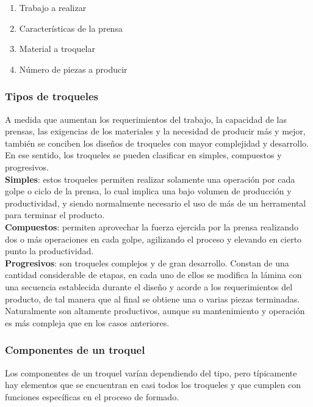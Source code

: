 \begin{enumerate}
\item Trabajo a realizar 
\item Características de la prensa
\item Material a troquelar
\item Número de piezas a producir
\end{enumerate}

\subsubsection{Tipos de troqueles}

A medida que aumentan los requerimientos del trabajo, la capacidad de las prensas, las exigencias 
de los materiales y la necesidad de producir más y mejor, también se conciben los diseños de 
troqueles con mayor complejidad y desarrollo. En ese sentido, los troqueles se pueden clasificar 
en simples, compuestos y progresivos.\\

\textbf{Simples}: estos troqueles permiten realizar solamente una operación por cada golpe o 
ciclo de la prensa, lo cual implica una bajo volumen de producción y productividad, y 
siendo normalmente necesario el uso de más de un herramental para terminar el producto.\\

\textbf{Compuestos}: permiten aprovechar la fuerza ejercida por la prensa realizando dos 
o más operaciones en cada golpe, agilizando el proceso y elevando en cierto punto 
la productividad.\\

\textbf{Progresivos}: son troqueles complejos y de gran desarrollo. Constan de una 
cantidad considerable de etapas, en cada uno de ellos se modifica la lámina con una secuencia 
establecida durante el diseño y acorde a los requerimientos del producto, de tal manera 
que al final se obtiene una o varias piezas terminadas. Naturalmente son altamente productivos, 
aunque su mantenimiento y operación es más compleja que en los casos anteriores.

\subsubsection{Componentes de un troquel}

Los componentes de un troquel varían dependiendo del tipo, pero típicamente hay elementos 
que se encuentran en casi todos los troqueles y que cumplen con funciones específicas 
en el proceso de formado.\\

